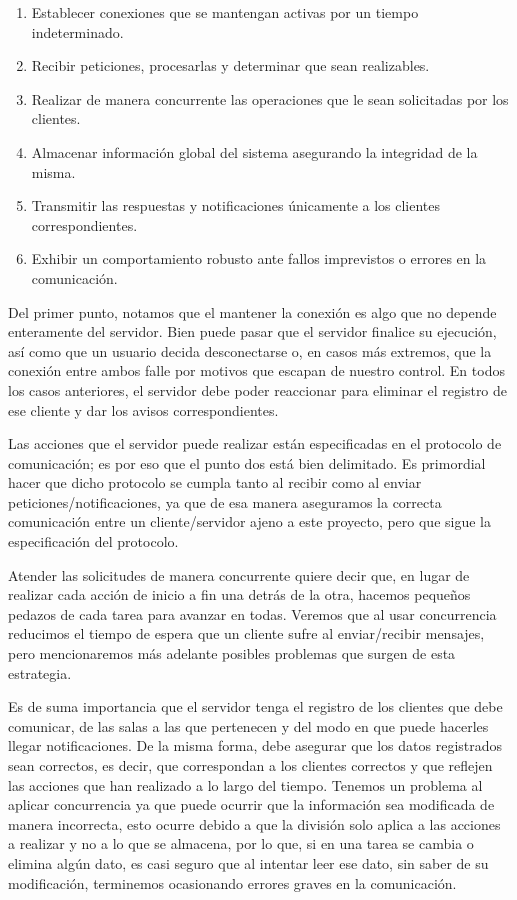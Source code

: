 \documentclass{replab}
\begin{document}
    \begin{enumerate}
    \item Establecer conexiones que se mantengan activas por un tiempo
      indeterminado.
    \item Recibir peticiones, procesarlas y determinar que sean
      realizables.
    \item Realizar de manera concurrente las operaciones que le sean
      solicitadas por los clientes.
    \item Almacenar información global del sistema asegurando la
      integridad de la misma.
    \item Transmitir las respuestas y notificaciones únicamente a los
      clientes correspondientes.
    \item Exhibir un comportamiento robusto ante fallos imprevistos o
      errores en la comunicación.
    \end{enumerate}

    Del primer punto, notamos que el mantener la conexión es algo que
    no depende enteramente del servidor. Bien puede pasar que el servidor
    finalice su ejecución, así como que un usuario decida desconectarse o,
    en casos más extremos, que la conexión entre ambos falle por motivos
    que escapan de nuestro control. En todos los casos anteriores, el
    servidor debe poder reaccionar para eliminar el registro de ese
    cliente y dar los avisos correspondientes.

    Las acciones que el servidor puede realizar están especificadas en el
    protocolo de comunicación; es por eso que el punto dos está bien
    delimitado. Es primordial hacer que dicho protocolo se cumpla tanto al
    recibir como al enviar peticiones/notificaciones, ya que de esa manera
    aseguramos la correcta comunicación entre un cliente/servidor ajeno a
    este proyecto, pero que sigue la especificación del protocolo.

    Atender las solicitudes de manera concurrente quiere decir que, en
    lugar de realizar cada acción de inicio a fin una detrás de la
    otra, hacemos pequeños pedazos de cada tarea para avanzar en
    todas. Veremos que al usar concurrencia reducimos el tiempo de
    espera que un cliente sufre al enviar/recibir mensajes, pero
    mencionaremos más adelante posibles problemas que surgen de esta
    estrategia.

    Es de suma importancia que el servidor tenga el registro de los
    clientes que debe comunicar, de las salas a las que pertenecen y
    del modo en que puede hacerles llegar notificaciones. De la misma
    forma, debe asegurar que los datos registrados sean correctos, es
    decir, que correspondan a los clientes correctos y que reflejen
    las acciones que han realizado a lo largo del tiempo. Tenemos un
    problema al aplicar concurrencia ya que puede ocurrir que la
    información sea modificada de manera incorrecta, esto ocurre
    debido a que la división solo aplica a las acciones a realizar y
    no a lo que se almacena, por lo que, si en una tarea se cambia o
    elimina algún dato, es casi seguro que al intentar leer ese dato,
    sin saber de su modificación, terminemos ocasionando errores
    graves en la comunicación.
\end{document}
